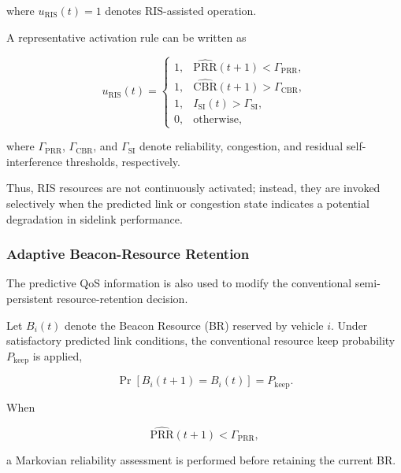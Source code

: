 where $u_{\mathrm{RIS}}(t)=1$ denotes RIS-assisted operation.

A representative activation rule can be written as

\begin{equation}
u_{\mathrm{RIS}}(t)
=
\begin{cases}
1,
&
\widehat{\mathrm{PRR}}(t+1)
<
\Gamma_{\mathrm{PRR}},
\\
1,
&
\widehat{\mathrm{CBR}}(t+1)
>
\Gamma_{\mathrm{CBR}},
\\
1,
&
I_{\mathrm{SI}}(t)
>
\Gamma_{\mathrm{SI}},
\\
0,
&
\text{otherwise},
\end{cases}
\label{eq:ris_activation_rule}
\end{equation}

where $\Gamma_{\mathrm{PRR}}$, $\Gamma_{\mathrm{CBR}}$, and
$\Gamma_{\mathrm{SI}}$ denote reliability, congestion, and residual
self-interference thresholds, respectively.

Thus, RIS resources are not continuously activated; instead, they are
invoked selectively when the predicted link or congestion state indicates
a potential degradation in sidelink performance.

\subsubsection{Adaptive Beacon-Resource Retention}

The predictive QoS information is also used to modify the conventional
semi-persistent resource-retention decision.

Let $B_i(t)$ denote the Beacon Resource (BR) reserved by vehicle $i$.
Under satisfactory predicted link conditions, the conventional resource
keep probability $P_{\mathrm{keep}}$ is applied,

\begin{equation}
\Pr
\left[
B_i(t+1)=B_i(t)
\right]
=
P_{\mathrm{keep}}.
\label{eq:ris_standard_keep}
\end{equation}

When

\begin{equation}
\widehat{\mathrm{PRR}}(t+1)
<
\Gamma_{\mathrm{PRR}},
\label{eq:ris_low_prr_condition}
\end{equation}

a Markovian reliability assessment is performed before retaining the
current BR.

